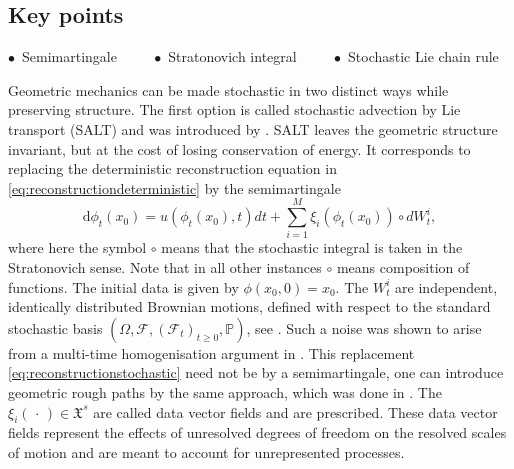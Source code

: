 \documentclass[11pt, oneside]{article}   	%
\numberwithin{equation}{section}
\theoremstyle{plain}
\theoremstyle{definition}
\theoremstyle{remark}
\newcommand{\<}{\langle}
\renewcommand{\>}{\rangle}
\def\rmd{{\mathrm{d}}}
\begin{document}
\subsection*{Key points}
\begin{center}
    $\bullet\,$ Semimartingale $\qquad$ 
    $\bullet\,$ Stratonovich integral $\qquad$ 
    $\bullet\,$ Stochastic Lie chain rule   
\end{center}
Geometric mechanics can be made stochastic in two distinct ways while preserving structure. The first option is called stochastic advection by Lie transport (SALT) and was introduced by \cite{Holm2015}. SALT leaves the geometric structure invariant, but at the cost of losing conservation of energy. It corresponds to replacing the deterministic reconstruction equation in \eqref{eq:reconstructiondeterministic} by the semimartingale 
\begin{equation}
{\rmd}\phi_t(x_0) = u(\phi_t(x_0),t)dt + \sum_{i=1}^M \xi_i(\phi_t(x_0))\circ dW_t^i,
\label{eq:reconstructionstochastic}
\end{equation}
where here the symbol $\circ$ means that the stochastic integral is taken in the Stratonovich sense. Note that in all other instances $\circ$ means composition of functions. The initial data is given by $\phi(x_0,0)=x_0$. The $W_t^i$ are independent, identically distributed Brownian motions, defined with respect to the standard stochastic basis $(\Omega,\mathcal{F},(\mathcal{F}_t)_{t\geq 0},\mathbb{P})$, see \cite{karatzas1998brownian}. Such a noise was shown to arise from a multi-time homogenisation argument in \cite{cotter2017stochastic}. This replacement \eqref{eq:reconstructionstochastic} need not be by a semimartingale, one can introduce geometric rough paths by the same approach, which was done in \cite{crisan2022variational}. The $\xi_i(\,\cdot\,)\in\mathfrak{X}^s$ are called data vector fields and are prescribed. These data vector fields represent the effects of unresolved degrees of freedom on the resolved scales of motion and are meant to account for unrepresented processes. 
\end{document}
